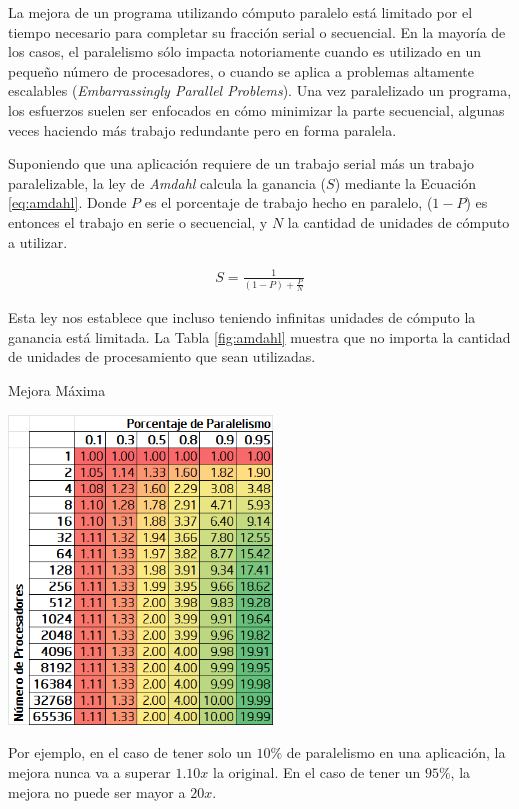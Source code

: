 \documentclass[a4paper]{report}
\begin{document}
La mejora de un programa utilizando cómputo paralelo está limitado por el tiempo necesario para completar su fracción serial o secuencial. En la mayoría de los casos, el paralelismo sólo impacta notoriamente cuando es utilizado en un pequeño número de procesadores, o cuando se aplica a problemas altamente escalables ({\it Embarrassingly Parallel Problems}). Una vez paralelizado un programa, los esfuerzos suelen ser enfocados en cómo minimizar la parte secuencial, algunas veces haciendo más trabajo redundante pero en forma paralela.

\bigskip

Suponiendo que una aplicación requiere de un trabajo serial más un trabajo paralelizable, la ley de {\it Amdahl} calcula la ganancia ($ S $) mediante la Ecuación \ref{eq:amdahl}.
Donde $ P $ es el porcentaje de trabajo hecho en paralelo, ($ 1-P $) es entonces el trabajo en serie o secuencial, y $ N $ la cantidad de unidades de cómputo a utilizar.

\begin{eqnarray}
\label{eq:amdahl}
S = \frac{1}{(1 - P) + \frac{P}{N}}
\end{eqnarray}

Esta ley nos establece que incluso teniendo infinitas unidades de cómputo la ganancia está limitada.
La Tabla \ref{fig:amdahl} muestra que no importa la cantidad de unidades de
procesamiento que sean utilizadas.

\begin{table}[H]
\caption{Mejora Máxima}
\centering
\includegraphics[width=7cm]{amdahl.png}

\label{fig:amdahl}
\end{table}

Por ejemplo, en el caso de tener solo un $ 10\% $ de paralelismo
en una aplicación, la mejora nunca va a superar $ 1.10x $ la original.
En el caso de tener un $ 95\% $, la mejora no puede ser mayor a $ 20x $.
\end{document}
